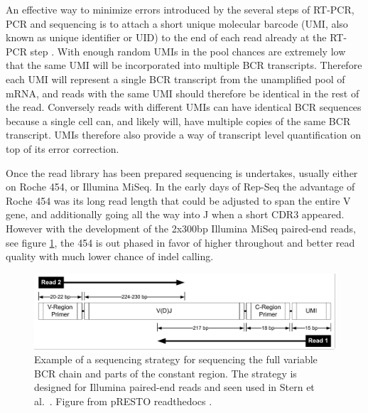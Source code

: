 An effective way to minimize errors introduced by the several steps of RT-PCR, PCR and sequencing is to attach a short unique molecular barcode (UMI, also known as unique identifier or UID) to the end of each read already at the RT-PCR step \cite{turchaninova2016high}.
With enough random UMIs in the pool chances are extremely low that the same UMI will be incorporated into multiple BCR transcripts.
Therefore each UMI will represent a single BCR transcript from the unamplified pool of mRNA, and reads with the same UMI should therefore be identical in the rest of the read.
Conversely reads with different UMIs can have identical BCR sequences because a single cell can, and likely will, have multiple copies of the same BCR transcript.
UMIs therefore also provide a way of transcript level quantification on top of its error correction.

Once the read library has been prepared sequencing is undertakes, usually either on Roche 454, or Illumina MiSeq.
In the early days of Rep-Seq the advantage of Roche 454 was its long read length that could be adjusted to span the entire V gene, and additionally going all the way into J when a short CDR3 appeared.
However with the development of the 2x300bp Illumina MiSeq paired-end reads, see figure \ref{fig:UMIread}, the 454 is out phased in favor of higher throughout and better read quality with much lower chance of indel calling.

\begin{figure}
    \centering
    \includegraphics[width=1\textwidth]{figures/Stern2014_ReadConfiguration.pdf}
    \caption{
        \label{fig:UMIread}
        Example of a sequencing strategy for sequencing the full variable BCR chain and parts of the constant region. The strategy is designed for Illumina paired-end reads and seen used in Stern et al.\ \cite{stern2014b}. Figure from pRESTO readthedocs \cite{vander2014presto}.
    }
\end{figure}


